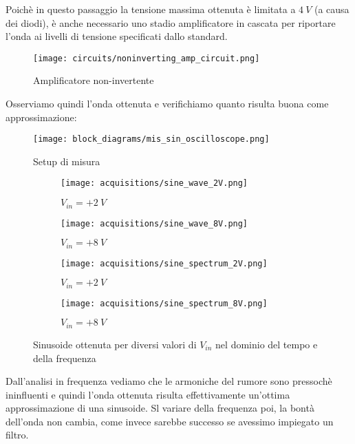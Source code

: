 Poichè in questo passaggio la tensione massima ottenuta è limitata a $4\ V$ (a causa dei diodi),
è anche necessario uno stadio amplificatore in cascata per riportare l'onda ai livelli di
tensione specificati dallo standard.

\begin{figure}[H]
    \centering
    \texttt{[image: circuits/noninverting\_amp\_circuit.png]}
    \caption{Amplificatore non-invertente}
    \label{noninverting_amp_circuit}
\end{figure}

Osserviamo quindi l'onda ottenuta e verifichiamo quanto risulta buona come approssimazione:

\begin{figure}[H]
    \centering
    \texttt{[image: block\_diagrams/mis\_sin\_oscilloscope.png]}
    \caption{Setup di misura}
    \label{mis_sin_oscilloscope}
\end{figure}

\begin{figure}[H]
    \centering

    \begin{subfigure}{.5\textwidth}
        \centering
        \texttt{[image: acquisitions/sine\_wave\_2V.png]}
        \caption{$V_{in}=+2\ V$}
        \label{acq_sine_2V}
    \end{subfigure}%
    \begin{subfigure}{.5\textwidth}
        \centering
        \texttt{[image: acquisitions/sine\_wave\_8V.png]}
        \caption{$V_{in}=+8\ V$}
        \label{acq_sine_8V}
    \end{subfigure}
    \begin{subfigure}{.5\textwidth}
        \centering
        \texttt{[image: acquisitions/sine\_spectrum\_2V.png]}
        \caption{$V_{in}=+2\ V$}
        \label{acq_fourier_2V}
    \end{subfigure}%
    \begin{subfigure}{.5\textwidth}
        \centering
        \texttt{[image: acquisitions/sine\_spectrum\_8V.png]}
        \caption{$V_{in}=+8\ V$}
        \label{acq_fourier_8V}
    \end{subfigure}

    \caption{Sinusoide ottenuta per diversi valori di $V_{in}$ nel dominio del tempo e
        della frequenza}
    \label{acq_sine}
\end{figure}

Dall'analisi in frequenza vediamo che le armoniche del rumore sono pressochè ininfluenti e
quindi l'onda ottenuta risulta effettivamente un'ottima approssimazione di una sinusoide.
Sl variare della frequenza poi, la bontà dell'onda non cambia, come invece sarebbe successo
se avessimo impiegato un filtro.

